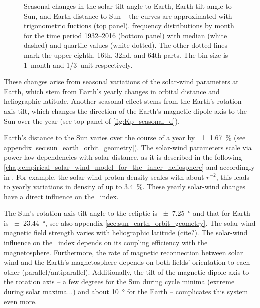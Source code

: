 \begin{figure}[htb]
\begin{floatrow}
{		}{
			\caption{Seasonal changes in the solar tilt angle to Earth, Earth tilt angle to Sun, and Earth distance to Sun -- the curves are approximated with trigonometric fuctions (top panel). \Kp{} frequency distributions by month for the time period 1932--2016 (bottom panel) with median (white dashed) and quartile values (white dotted). The other dotted lines mark the upper eighth, 16th, 32nd, and 64th parts. The bin size is 1~month and \SI{1/3}{\Kp}~unit respectively.}
			\label{fig:Kp_seasonal_d}
		}
	\end{floatrow}
\end{figure}
These \Kp{} changes arise from seasonal variations of the solar-wind parameters at Earth, which stem from Earth's yearly changes in orbital distance and heliographic latitude. Another seasonal effect stems from the Earth's rotation axis tilt, which changes the direction of the Earth's magnetic dipole axis to the Sun over the year (see top panel of \autoref{fig:Kp_seasonal_d}).

Earth's distance to the Sun varies over the course of a year by \SI{+-1.67}{\percent} (see appendix \autoref{sec:sun_earth_orbit_geometry}). The solar-wind parameters scale via power-law dependencies with solar distance, as it is described in the following \autoref{chap:empirical_solar_wind_model_for_the_inner_heliosphere} and accordingly in \citet{Venzmer2017}. For example, the solar-wind proton density scales with about $r^{-2}$, this leads to yearly variations in density of up to \SI{3.4}{\percent}. These yearly solar-wind changes have a direct influence on the \Kp{}~index.

The Sun's rotation axis tilt angle to the ecliptic is \SI{+-7.25}{\degree} and that for Earth is \SI{+-23.44}{\degree}, see also appendix \autoref{sec:sun_earth_orbit_geometry}. The solar-wind magnetic field strength varies with heliographic latitude (cite?). The solar-wind influence on the \Kp{}~index depends on its coupling efficiency with the magnetosphere. Furthermore, the rate of magnetic reconnection between solar wind and the Earth's magnetosphere depends on both fields' orientation to each other (parallel/antiparallel). Additionally, the tilt of the magnetic dipole axis to the rotation axis -- a few degrees for the Sun during cycle minima (extreme during solar maxima...) and about \SI{10}{\degree} for the Earth -- complicates this system even more.

